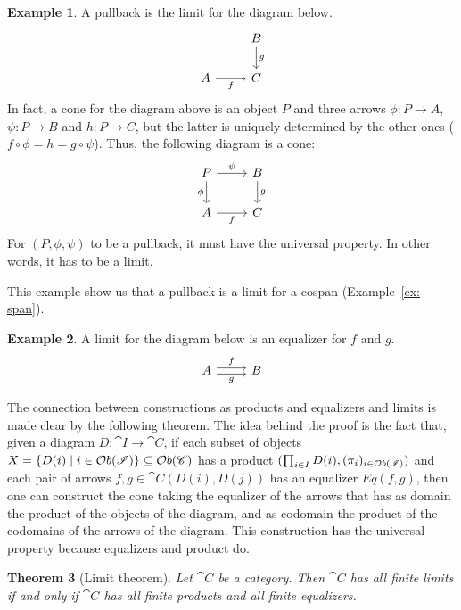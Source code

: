 \documentclass[a4paper, twoside,openright]{report}
\theoremstyle{plain}
\newtheorem{theorem}{Theorem}[section]
\theoremstyle{definition}
\newtheorem{example}[theorem]{Example}
\begin{document}
\begin{example}
    A pullback is the limit for the diagram below.
    \[
        \begin{tikzcd}
            & B \arrow[d, "g"] \\
            A \arrow[r, "f" swap] & C
        \end{tikzcd}
    \]
    In fact, a cone for the diagram above is an object $P$ and three arrows $\phi:P \rightarrow A$, $\psi: P \rightarrow B$ and $h: P \rightarrow C$, but the latter is uniquely determined by the other ones ($f \circ \phi = h = g \circ \psi$).
    Thus, the following diagram is a cone:
    \[
        \begin{tikzcd}
            P \arrow[r, "{\psi}"] \arrow[d, "{\phi}" swap] & B \arrow[d, "g"] \\
            A \arrow[r, "f" swap] & C
        \end{tikzcd}
    \]
    For $(P, \phi, \psi)$ to be a pullback, it must have the universal property. In other words, it has to be a limit.

    This example show us that a pullback is a limit for a cospan (Example~\ref{ex: span}).
\end{example}

\begin{example}\label{ex:equaliz_are_limits}
    A limit for the diagram below is an equalizer for $f$ and $g$.
    \[
        \begin{tikzcd}
            A \arrow[r, shift left, "f"] \arrow[r, shift right,"g"swap] & B
        \end{tikzcd}
    \]
\end{example}


The connection between constructions as products and equalizers and limits is made clear by the following theorem. The idea behind the proof is the fact that, given a diagram $D : \cat I \rightarrow \cat C$, if each subset of objects $X = \{D(i) \mid i \in \mathcal{O}b(\mathscr{I})\} \subseteq \mathcal{O}b(\mathscr{C})$ has a product $(\prod_{i \in I} D(i), (\pi_i)_{i \in \mathcal{O}b( \mathscr{I})})$ and each pair of arrows $f, g \in \cat C (D(i), D(j))$ has an equalizer $Eq(f, g)$, then one can construct the cone taking the equalizer of the arrows that has as domain the product of the objects of the diagram, and as codomain the product of the codomains of the arrows of the diagram. This construction has the universal property because equalizers and product do.

\begin{theorem}[Limit theorem]
    Let $\cat C$ be a category. Then $\cat C$ has all finite limits if and only if $\cat C$ has all finite products and all finite equalizers.
\end{theorem}
\end{document}
